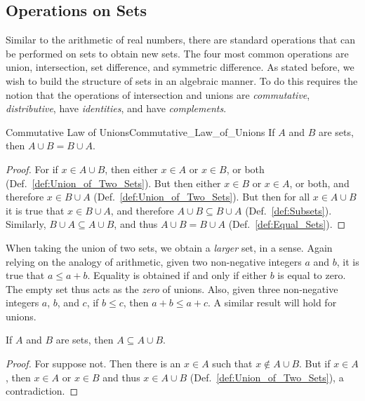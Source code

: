     \subsection{Operations on Sets}
        Similar to the arithmetic of real numbers, there are standard operations
        that can be performed on sets to obtain new sets. The four most common
        operations are union, intersection, set difference, and symmetric
        difference. As stated before, we wish to build the structure of sets in
        an algebraic manner. To do this requires the notion that the operations
        of intersection and unions are \textit{commutative},
        \textit{distributive}, have \textit{identities}, and have
        \textit{complements}.
        \begin{ltheorem}{Commutative Law of Unions}{Commutative_Law_of_Unions}
            If $A$ and $B$ are sets, then $A\cup{B}=B\cup{A}$.
        \end{ltheorem}
        \begin{proof}
            For if $x\in{A}\cup{B}$, then either $x\in{A}$ or $x\in{B}$, or both
            (Def.~\ref{def:Union_of_Two_Sets}). But then either $x\in{B}$ or
            $x\in{A}$, or both, and therefore $x\in{B}\cup{A}$
            (Def.~\ref{def:Union_of_Two_Sets}). But then for all
            $x\in{A}\cup{B}$ it is true that $x\in{B}\cup{A}$, and therefore
            $A\cup{B}\subseteq{B}\cup{A}$ (Def.~\ref{def:Subsets}). Similarly,
            $B\cup{A}\subseteq{A}\cup{B}$, and thus
            $A\cup{B}=B\cup{A}$ (Def.~\ref{def:Equal_Sets}).
        \end{proof}
        When taking the union of two sets, we obtain a \textit{larger} set, in
        a sense. Again relying on the analogy of arithmetic, given two
        non-negative integers $a$ and $b$, it is true that $a\leq{a}+b$.
        Equality is obtained if and only if either $b$ is equal to zero. The
        empty set thus acts as the \textit{zero} of unions. Also, given three
        non-negative integers $a$, $b$, and $c$, if $b\leq{c}$, then
        $a+b\leq{a}+c$. A similar result will hold for unions.
        \begin{theorem}
            \label{thm:Union_is_Bigger}%
            If $A$ and $B$ are sets, then $A\subseteq{A}\cup{B}$.
        \end{theorem}
        \begin{proof}
            For suppose not. Then there is an $x\in{A}$ such that
            $x\notin{A}\cup{B}$. But if $x\in{A}$, then $x\in{A}$ or $x\in{B}$
            and thus $x\in{A}\cup{B}$ (Def.~\ref{def:Union_of_Two_Sets}), a
            contradiction.
        \end{proof}
